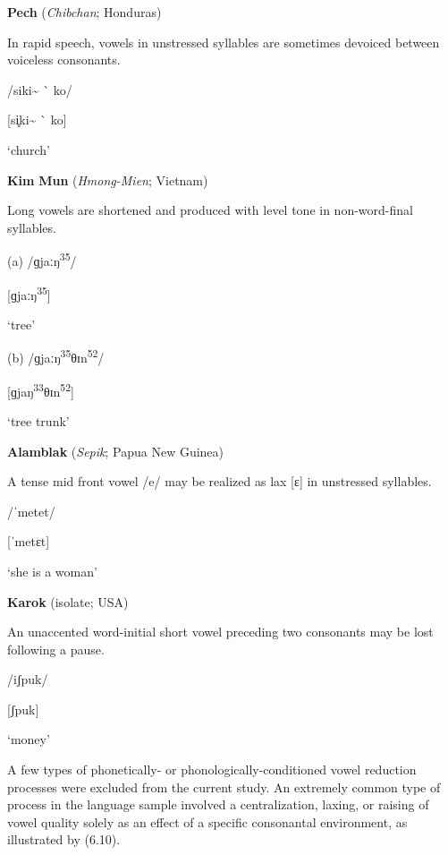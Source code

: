 \ea\label{ex:(6.6)}
   \textbf{Pech} (\textit{Chibchan}; Honduras)

In rapid speech, vowels in unstressed syllables are sometimes devoiced between voiceless consonants.

/siki\~{} \`{} ko/

[si̥ki\~{} \`{} ko]

‘church’

\citep[18]{Holt1999}

\z

\ea\label{ex:(6.7)}
   \textbf{Kim} \textbf{Mun} (\textit{Hmong-Mien}; Vietnam)

Long vowels are shortened and produced with level tone in non-word-final syllables. 

(a)  /ɡjaːŋ\textsuperscript{35}/

[ɡjaːŋ\textsuperscript{35}]

‘tree’

(b)  /ɡjaːŋ\textsuperscript{35}θɪn\textsuperscript{52}/

[ɡjaŋ\textsuperscript{33}θɪn\textsuperscript{52}]

‘tree trunk’

\citep[117]{Clark2008}

\z

\ea\label{ex:(6.8)}
  \textbf{Alamblak} (\textit{Sepik}; Papua New Guinea)

A tense mid front vowel /e/ may be realized as lax [ɛ] in unstressed syllables.

/ˈmetet/

[ˈmetɛt]

‘she is a woman’

\citep[38]{Bruce1984}

\z

\ea\label{ex:(6.9)}
   \textbf{Karok} (isolate; USA)

An unaccented word-initial short vowel preceding two consonants may be lost following a pause. 

/iʃpuk/

[ʃpuk]

‘money’

\citep[53]{Bright1957}

\z

  A few types of phonetically- or phonologically-conditioned vowel reduction processes were excluded from the current study. An extremely common type of process in the language sample involved a centralization, laxing, or raising of vowel quality solely as an effect of a specific consonantal environment, as illustrated by (6.10).

